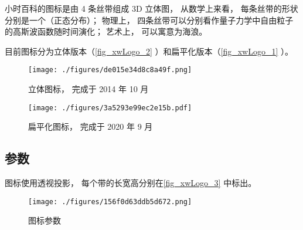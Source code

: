 
\begin{issues}
\issueTODO
\end{issues}

小时百科的图标是由 4 条丝带组成 3D 立体图， 从数学上来看， 每条丝带的形状分别是一个（正态分布）； 物理上， 四条丝带可以分别看作量子力学中自由粒子的高斯波函数随时间演化； 艺术上， 可以寓意为海浪。

目前图标分为立体版本（\autoref{fig_xwLogo_2} ）和扁平化版本（\autoref{fig_xwLogo_1} ）。

\begin{figure}[ht]
\centering
\texttt{[image: ./figures/de015e34d8c8a49f.png]}
\caption{立体图标， 完成于 2014 年 10 月} \label{fig_xwLogo_2}
\end{figure}

\begin{figure}[ht]
\centering
\texttt{[image: ./figures/3a5293e99ec2e15b.pdf]}
\caption{扁平化图标， 完成于 2020 年 9 月} \label{fig_xwLogo_1}
\end{figure}

\subsection{参数}
图标使用透视投影， 每个带的长宽高分别在\autoref{fig_xwLogo_3} 中标出。
\begin{figure}[ht]
\centering
\texttt{[image: ./figures/156f0d63ddb5d672.png]}
\caption{图标参数} \label{fig_xwLogo_3}
\end{figure}
